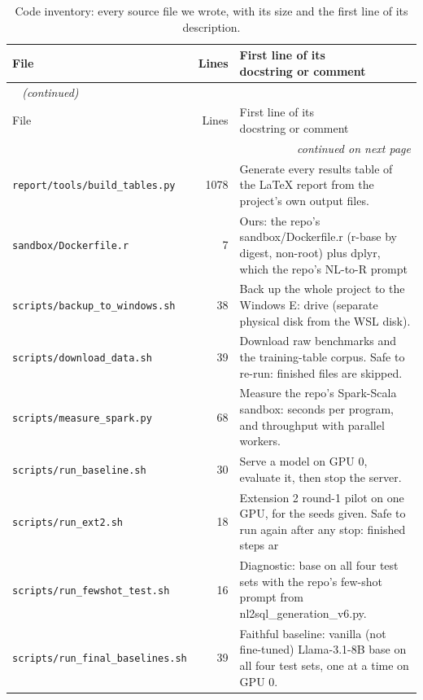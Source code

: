 {\footnotesize
{}
\setlength{\tabcolsep}{4.2pt}
\begin{longtable}{@{}p{4.6cm}rp{9.2cm}@{}}
\caption{Code inventory: every source file we wrote, with its size and the first line of its description.}\label{tab:gen-code}\\
\toprule
\rowcolor{headshade}File & Lines & \makecell{First line of its\\docstring or comment}\\
\midrule
\endfirsthead
\multicolumn{3}{l}{\textit{\tablename~\thetable{} (continued)}}\\
\toprule
\rowcolor{headshade}File & Lines & \makecell{First line of its\\docstring or comment}\\
\midrule
\endhead
\midrule
\multicolumn{3}{r}{\textit{continued on next page}}\\
\endfoot
\bottomrule
\endlastfoot
\texttt{report/tools/build\_tables.py} & 1078 & Generate every results table of the LaTeX report from the project's own output files.\\
\texttt{sandbox/Dockerfile.r} & 7 & Ours: the repo's sandbox/Dockerfile.r (r-base by digest, non-root) plus dplyr, which the repo's NL-to-R prompt\\
\texttt{scripts/backup\_to\_windows.sh} & 38 & Back up the whole project to the Windows E: drive (separate physical disk from the WSL disk).\\
\texttt{scripts/download\_data.sh} & 39 & Download raw benchmarks and the training-table corpus. Safe to re-run: finished files are skipped.\\
\texttt{scripts/measure\_spark.py} & 68 & Measure the repo's Spark-Scala sandbox: seconds per program, and throughput with parallel workers.\\
\texttt{scripts/run\_baseline.sh} & 30 & Serve a model on GPU 0, evaluate it, then stop the server.\\
\texttt{scripts/run\_ext2.sh} & 18 & Extension 2 round-1 pilot on one GPU, for the seeds given. Safe to run again after any stop: finished steps ar\\
\texttt{scripts/run\_fewshot\_test.sh} & 16 & Diagnostic: base on all four test sets with the repo's few-shot prompt from nl2sql\_generation\_v6.py.\\
\texttt{scripts/run\_final\_baselines.sh} & 39 & Faithful baseline: vanilla (not fine-tuned) Llama-3.1-8B base on all four test sets, one at a time on GPU 0.\\

\end{longtable}}
